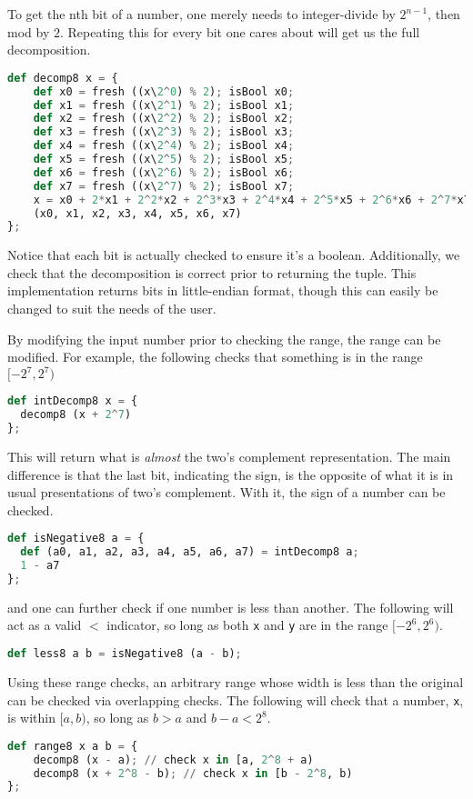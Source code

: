 To get the nth bit of a number, one merely needs to integer-divide by $2^{n-1}$, then mod by $2$. Repeating this for every bit one cares about will get us the full decomposition.

\begin{lstlisting}[language=Python]
  def decomp8 x = {
    def x0 = fresh ((x\2^0) % 2); isBool x0;
    def x1 = fresh ((x\2^1) % 2); isBool x1;
    def x2 = fresh ((x\2^2) % 2); isBool x2;
    def x3 = fresh ((x\2^3) % 2); isBool x3;
    def x4 = fresh ((x\2^4) % 2); isBool x4;
    def x5 = fresh ((x\2^5) % 2); isBool x5;
    def x6 = fresh ((x\2^6) % 2); isBool x6;
    def x7 = fresh ((x\2^7) % 2); isBool x7;
    x = x0 + 2*x1 + 2^2*x2 + 2^3*x3 + 2^4*x4 + 2^5*x5 + 2^6*x6 + 2^7*x7;
    (x0, x1, x2, x3, x4, x5, x6, x7)
};
\end{lstlisting}

Notice that each bit is actually checked to ensure it's a boolean. Additionally, we check that the decomposition is correct prior to returning the tuple. This implementation returns bits in little-endian format, though this can easily be changed to suit the needs of the user.

By modifying the input number prior to checking the range, the range can be modified. For example, the following checks that something is in the range $[-2^7, 2^7)$

\begin{lstlisting}[language=Python]
def intDecomp8 x = {
  decomp8 (x + 2^7)
};
\end{lstlisting}

This will return what is \textit{almost} the two's complement representation. The main difference is that the last bit, indicating the sign, is the opposite of what it is in usual presentations of two's complement. With it, the sign of a number can be checked.

\begin{lstlisting}[language=Python]
def isNegative8 a = {
  def (a0, a1, a2, a3, a4, a5, a6, a7) = intDecomp8 a;
  1 - a7
};
\end{lstlisting}

and one can further check if one number is less than another. The following will act as a valid $<$ indicator, so long as both \lstinline{x} and \lstinline{y} are in the range $[-2^6, 2^6)$.

\begin{lstlisting}[language=Python]
def less8 a b = isNegative8 (a - b);
\end{lstlisting}

Using these range checks, an arbitrary range whose width is less than the original can be checked via overlapping checks. The following will check that a number, \lstinline{x}, is within $[a, b)$, so long as $b > a$ and $b - a < 2^8$.

\begin{lstlisting}[language=Python]
def range8 x a b = {
    decomp8 (x - a); // check x in [a, 2^8 + a)
    decomp8 (x + 2^8 - b); // check x in [b - 2^8, b)
};
\end{lstlisting}


